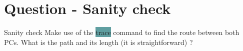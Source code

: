 \section{Question - Sanity check}

\begin{questionBox}{Sanity check}
    Make use of the \colorbox{CadetBlue}{trace} command to find the route between both PCs. What is the path and its length (it is straightforward) ?
\end{questionBox}
